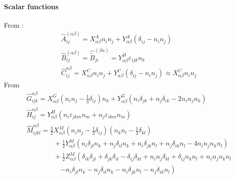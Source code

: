 \documentclass[12pt]{article}
\begin{document}
\paragraph{Scalar functions}

From \citet{Jeffrey_1984}:
\begin{align}
  &\hat{A}_{ij}^{(\alpha \beta)}
   = 
  X_{\alpha \beta}^{A} n_i n_j
  +
  Y_{\alpha \beta}^{A} (\delta_{ij} - n_i n_j) \\
  & \hat{B}_{ij}^{(\alpha \beta)}
  =
  \hat{\tilde{B}}_{ji}^{(\beta\alpha)}
  = 
  Y_{\alpha \beta}^{B}   \varepsilon_{ijk} n_k\\
  &\hat{C}_{ij}^{\alpha \beta}
  = 
  X_{\alpha \beta}^{C} n_i n_j
  +
  Y_{\alpha \beta}^{C} (\delta_{ij} - n_i n_j)
 \approx
  X_{\alpha \beta}^{C} n_i n_j
\end{align}
From \citet{Jeffrey_1992}
\begin{align}
& \hat{G}_{ijk}^{\alpha \beta}
 = 
X_{\alpha\beta}^{G} 
\left(n_i n_j - \frac{1}{3}\delta_{ij}\right)n_k
+
Y_{\alpha\beta}^{G}
\left(
n_i \delta_{jk} + n_j \delta_{ik} - 2 n_i n_j n_k
\right) \\
& 
\hat{H}_{ij}^{\alpha\beta}
 = Y_{\alpha\beta}^{H}
(n_i \varepsilon_{jkm} n_m 
+ n_j \varepsilon_{ikm} n_m )\\
&
 \hat{M}_{ijkl}^{\alpha\beta}
=  \frac{3}{2}
X_{\alpha\beta}^{M}
 \left(n_i n_j
 - \frac{1}{3} \delta_{ij}
\right)
 \left(n_k n_l
 - \frac{1}{3} \delta_{kl}
\right) \\
&\qquad\qquad
+
\frac{1}{2} 
Y_{\alpha\beta}^{M}
\left(
n_i \delta_{jl} n_k
+
n_j \delta_{il} n_k
+
n_i \delta_{jk} n_l
+
n_j \delta_{ik} n_l
-
4 n_i n_j n_k n_l
\right) \\
&\qquad\qquad
+ 
\frac{1}{2}
Z_{\alpha\beta}^{M}
\left(
\delta_{ik}\delta_{jl}
+
\delta_{jk}\delta_{il}
-
\delta_{ij}\delta_{kl}
+
n_i n_j \delta_{kl} 
+
\delta_{ij} n_k n_l
+
n_i n_j n_k n_l \right.\\
&\qquad \qquad \quad
\left.
- 
n_i \delta_{jl} n_k
-
n_j \delta_{il} n_k
-
n_i \delta_{jk} n_l
-
n_j \delta_{ik} n_l
\right) 
\end{align}
\end{document}
